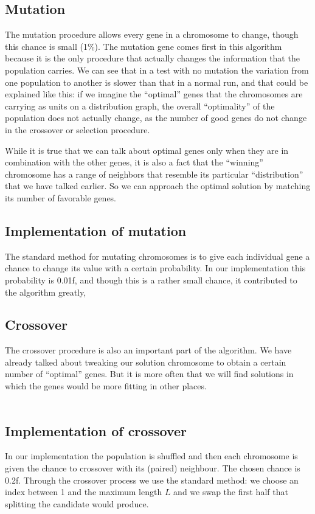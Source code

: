 \documentclass{article}
\begin{document}
\subsection{Mutation}
The mutation procedure allows every gene in a chromosome to change, though this chance is small (1\%). The mutation gene comes first in this algorithm because it is the only procedure that actually changes the information that the population carries. We can see that in a test with no mutation the variation from one population to another is slower than that in a normal run, and that could be explained like this: if we imagine the “optimal” genes that the chromosomes are carrying as units on a distribution graph, the overall “optimality” of the population does not actually change, as the number of good genes do not change in the crossover or selection procedure.
\par While it is true that we can talk about optimal genes only when they are in combination with the other genes, it is also a fact that the “winning” chromosome has a range of neighbors that resemble its particular “distribution” that we have talked earlier. So we can approach the optimal solution by matching its number of favorable genes.

\subsection{Implementation of mutation}
The standard method for mutating chromosomes is to give each individual gene a chance to change its value with a certain probability. In our implementation this probability is 0.01f, and though this is a rather small chance, it contributed to the algorithm greatly,

\subsection{Crossover}
The crossover procedure is also an important part of the algorithm. We have already talked about tweaking our solution chromosome to obtain a certain number of “optimal” genes. But it is more often that we will find solutions in which the genes would be more fitting in other places. \\\\

\subsection{Implementation of crossover}
In our implementation the population is shuffled and then each chromosome is given the chance to crossover with its (paired) neighbour. The chosen chance is 0.2f. Through the crossover process we use the standard method: we choose an index between 1 and the maximum length $L$ and we swap the first half that splitting the candidate would produce.
\end{document}
